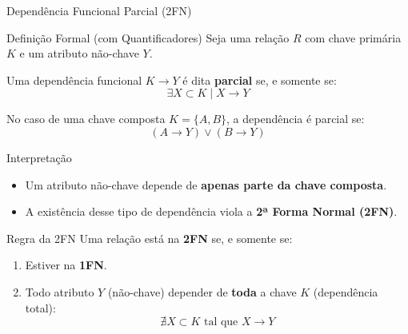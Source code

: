 \documentclass[9pt]{beamer}
\begin{document}
\begin{frame}{Dependência Funcional Parcial (2FN)}
\small
\begin{block}{Definição Formal (com Quantificadores)}
Seja uma relação $R$ com chave primária $K$ e um atributo não-chave $Y$.

Uma dependência funcional $K \rightarrow Y$ é dita \textbf{parcial} se, e somente se:
\[
\exists X \subset K \mid X \rightarrow Y
\]

No caso de uma chave composta $K = \{A, B\}$, a dependência é parcial se:
\[
(A \rightarrow Y) \lor (B \rightarrow Y)
\]
\end{block}

\vspace{0.4cm}

\begin{alertblock}{Interpretação}
\begin{itemize}
    \item Um atributo não-chave depende de \textbf{apenas parte da chave composta}.
    \item A existência desse tipo de dependência viola a \textbf{2ª Forma Normal (2FN)}.
\end{itemize}
\end{alertblock}

\vspace{0.3cm}

\begin{block}{Regra da 2FN}
Uma relação está na \textbf{2FN} se, e somente se:
\begin{enumerate}
    \item Estiver na \textbf{1FN}.
    \item Todo atributo $Y$ (não-chave) depender de \textbf{toda} a chave $K$ (dependência total):
    \[
    \nexists X \subset K \text{ tal que } X \rightarrow Y
    \]
\end{enumerate}
\end{block}

\end{frame}
\end{document}
